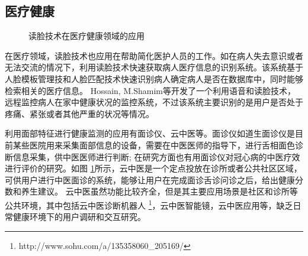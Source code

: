 \subsection{医疗健康}
\begin{figure}[h]
    \centering
    \caption{读脸技术在医疗健康领域的应用}
    \label{fig:med}
\end{figure}
在医疗领域，读脸技术也应用在帮助简化医护人员的工作。如在病人失去意识或者无法交流的情况下，利用读脸技术快速获取病人医疗信息的识别系统\cite{nwosu2016mobile}。该系统基于人脸模板管理技和人脸匹配技术快速识别病人确定病人是否在数据库中，同时能够检索相关的医疗信息。
Hossain, M.Shamim等\cite{Hossain2015Cloud}开发了一个利用语音和读脸技术，远程监控病人在家中健康状况的监控系统，不过该系统主要识别的是用户是否处于疼痛、紧张或者其他严重的状况等情况。

利用面部特征进行健康监测的应用有面诊仪、云中医\cite{Zhang2018Study}等。面诊仪如道生面诊仪\cite{邸丹2016手持式舌象仪的研制}是目前某些医院用来采集面部信息的设备，需要在中医医师的指导下，进行舌相面色诊断信息采集，供中医医师进行判断; 在研究方面也有用面诊仪对冠心病的中医疗效进行评价的研究。如图 \ref{fig:med}所示，云中医是一个定点投放在诊所或者公共社区区域，可供用户进行中医面诊的系统，能够让用户在完成面诊舌诊问诊之后，给出健康分数和养生建议。
云中医虽然功能比较齐全，但是其主要应用场景是社区和诊所等公共环境，其中包括云中医诊断机器人 \footnote{http://www.sohu.com/a/135358060\_205169/}，云中医智能镜\cite{李雪2016}，云中医应用\cite{钱鹏基于云中医的健康监测方法及系统}等，缺乏日常健康环境下的用户调研和交互研究。


